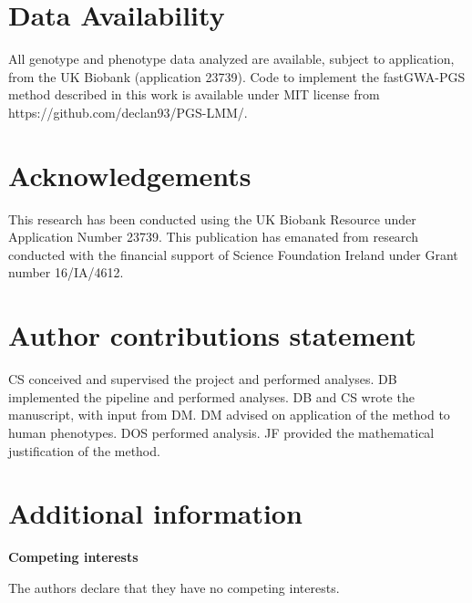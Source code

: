 \documentclass[fleqn,10pt]{wlscirep}
\begin{document}
\section*{Data Availability}
All genotype and phenotype data analyzed are available, subject to application, from the UK Biobank (application 23739). Code to implement the fastGWA-PGS method described in this work is available under MIT license from https://github.com/declan93/PGS-LMM/.
\par\par 



\section*{Acknowledgements}

This research has been conducted using the UK Biobank Resource under Application Number 23739. This publication has emanated from research conducted with the financial support of Science Foundation Ireland under Grant number 16/IA/4612.

\section*{Author contributions statement}

CS conceived and supervised the project and performed analyses. DB implemented the pipeline and performed analyses. DB and CS wrote the manuscript, with input from DM. DM advised on application of the method to human phenotypes. DOS performed analysis. JF provided the mathematical justification of the method. 

\section*{Additional information}
\textbf{Competing interests} \par The authors declare that they have no competing interests. 


\pagebreak
%
%
\end{document}

